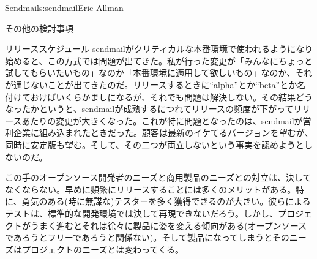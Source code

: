 \begin{aosachapter}{Sendmail}{s:sendmail}{Eric Allman}
\begin{aosasect1}{その他の検討事項}
\begin{aosasect2}{リリーススケジュール}
sendmailがクリティカルな本番環境で使われるようになり始めると、この方式では問題が出てきた。私が行った変更が「みんなにちょっと試してもらいたいもの」なのか「本番環境に適用して欲しいもの」なのか、それが通じないことが出てきたのだ。リリースするときに``alpha''とか``beta''とか名付けておけばいくらかましになるが、それでも問題は解決しない。その結果どうなったかというと、sendmailが成熟するにつれてリリースの頻度が下がってリリースあたりの変更が大きくなった。これが特に問題となったのは、sendmailが営利企業に組み込まれたときだった。顧客は最新のイケてるバージョンを望むが、同時に安定版も望む。そして、その二つが両立しないという事実を認めようとしないのだ。

この手のオープンソース開発者のニーズと商用製品のニーズとの対立は、決してなくならない。早めに頻繁にリリースすることには多くのメリットがある。特に、勇気のある(時に無謀な)テスターを多く獲得できるのが大きい。彼らによるテストは、標準的な開発環境では決して再現できないだろう。しかし、プロジェクトがうまく進むとそれは徐々に製品に姿を変える傾向がある(オープンソースであろうとフリーであろうと関係ない)。そして製品になってしまうとそのニーズはプロジェクトのニーズとは変わってくる。

\end{aosasect2}

\end{aosasect1}


\end{aosachapter}
